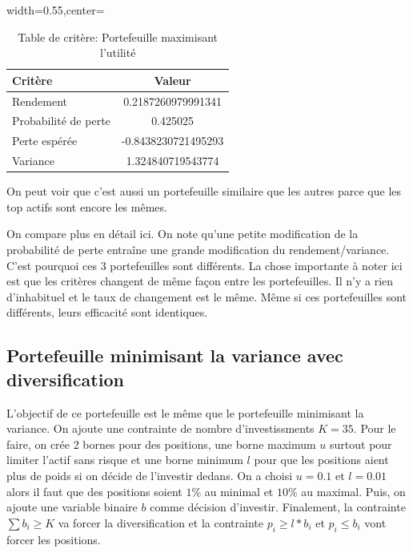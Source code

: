 \documentclass[letterpaper,11pt]{article}
\newcommand{\?}{\stackrel{?}{=}}
\begin{document}
\begin{table}[htbp]
\centering
\begin{adjustbox}{width=0.55\textwidth,center=\textwidth}
\begin{tabular}{ l c }
\toprule
\textbf{Critère} & \textbf{Valeur}  \\
\midrule
\rowcolor{black!10}Rendement & 0.2187260979991341  \\
Probabilité de perte & 0.425025  \\
\rowcolor{black!10}Perte espérée & -0.8438230721495293  \\
Variance & 1.324840719543774  \\
\bottomrule
\end{tabular}
\end{adjustbox}
\caption{Table de critère: Portefeuille maximisant l'utilité}
\label{tab:maxutil}
\end{table}

On peut voir que c'est aussi un portefeuille similaire que les autres parce que les top actifs sont encore les mêmes.

On compare plus en détail ici. On note qu'une petite modification de la probabilité de perte entraîne une grande modification du rendement/variance. C'est pourquoi ces 3 portefeuilles sont différents. La chose importante à noter ici est que les critères changent de même façon entre les portefeuilles. Il n'y a rien d'inhabituel et le taux de changement est le même. Même si ces portefeuilles sont différents, leurs efficacité sont identiques.

\newpage 
\subsection*{Portefeuille minimisant la variance avec diversification}

L'objectif de ce portefeuille est le même que le portefeuille minimisant la variance. On ajoute une contrainte de nombre d'investissments $K=35$. Pour le faire, on crée 2 bornes pour des positions, une borne maximum $u$ surtout pour limiter l'actif sans risque et une borne minimum $l$ pour que les positions aient plus de poids si on décide de l'investir dedans. On a choisi $u = 0.1$ et $l=0.01$ alors il faut que des positions soient $1\%$ au minimal et $10\%$ au maximal. Puis, on ajoute une variable binaire $b$ comme décision d'investir. Finalement, la contrainte $\sum b_i\geq K$ va forcer la diversification et la contrainte $p_i\geq l*b_i$ et $p_i \leq b_i$ vont forcer les positions.
\end{document}
